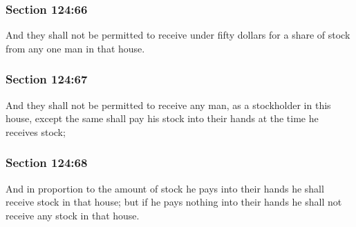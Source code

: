 	\subsubsection{Section 124:66} %
		\label{DC124-66}

		And they shall not be permitted to receive under fifty dollars for a share of stock from any one man in that house.


	\subsubsection{Section 124:67} %
		\label{DC124-67}

		And they shall not be permitted to receive any man, as a stockholder in this house, except the same shall pay his stock into their hands at the time he receives stock;


	\subsubsection{Section 124:68} %
		\label{DC124-68}

		And in proportion to the amount of stock he pays into their hands he shall receive stock in that house; but if he pays nothing into their hands he shall not receive any stock in that house.


